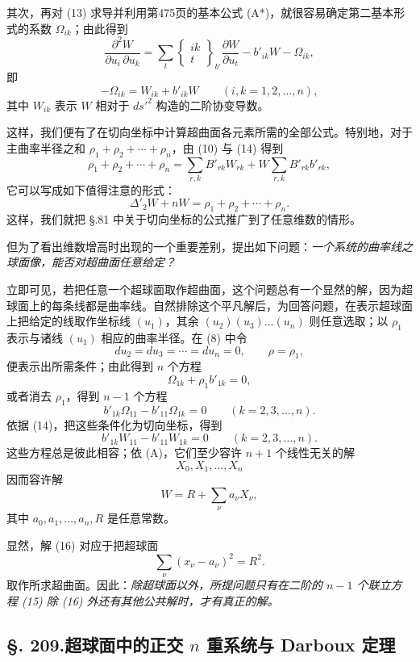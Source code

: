 其次，再对 (13) 求导并利用第475页的基本公式 (A*)，就很容易确定第二基本形式的系数 $\Omega_{ik}$；由此得到
\[
\frac{\partial^2W}{\partial u_i\,\partial u_k}
=\sum_t\left\{\begin{matrix}ik\\t\end{matrix}\right\}_{b'}
\frac{\partial W}{\partial u_t}-b'_{ik}W-\Omega_{ik},
\]
即
\[
\tag{14}
-\Omega_{ik}=W_{ik}+b'_{ik}W\qquad (i,k=1,2,\ldots,n),
\]
其中 $W_{ik}$ 表示 $W$ 相对于 $ds'^2$ 构造的二阶协变导数。

这样，我们便有了在切向坐标中计算超曲面各元素所需的全部公式。特别地，对于主曲率半径之和 $\rho_1+\rho_2+\cdots+\rho_n$，由 (10) 与 (14) 得到
\[
\rho_1+\rho_2+\cdots+\rho_n
=\sum_{r,k}B'_{rk}W_{rk}+W\sum_{r,k}B'_{rk}b'_{rk},
\]
它可以写成如下值得注意的形式：
\[
\tag{VI}
\Delta'_2W+nW=\rho_1+\rho_2+\cdots+\rho_n.
\]
这样，我们就把 \S.81 中关于切向坐标的公式推广到了任意维数的情形。

但为了看出维数增高时出现的一个重要差别，提出如下问题：\emph{一个系统的曲率线之球面像，能否对超曲面任意给定？}

立即可见，若把任意一个超球面取作超曲面，这个问题总有一个显然的解，因为超球面上的每条线都是曲率线。自然排除这个平凡解后，为回答问题，在表示超球面上把给定的线取作坐标线 $(u_1)$，其余 $(u_2)(u_3)\ldots(u_n)$ 则任意选取；以 $\rho_1$ 表示与诸线 $(u_1)$ 相应的曲率半径。在 (8) 中令
\[
du_2=du_3=\cdots=du_n=0,\qquad \rho=\rho_1,
\]
便表示出所需条件；由此得到 $n$ 个方程
\[
\Omega_{1k}+\rho_1b'_{1k}=0,
\]
或者消去 $\rho_1$，得到 $n-1$ 个方程
\[
b'_{1k}\Omega_{11}-b'_{11}\Omega_{1k}=0\qquad(k=2,3,\ldots,n).
\]
依据 (14)，把这些条件化为切向坐标，得到
\[
\tag{15}
b'_{1k}W_{11}-b'_{11}W_{1k}=0\qquad(k=2,3,\ldots,n).
\]
这些方程总是彼此相容；依 (A)，它们至少容许 $n+1$ 个线性无关的解
\[
X_0,X_1,\ldots,X_n
\]
因而容许解
\[
\tag{16}
W=R+\sum_\nu a_\nu X_\nu,
\]
其中 $a_0,a_1,\ldots,a_n,R$ 是任意常数。

显然，解 (16) 对应于把超球面
\[
\sum_\nu (x_\nu-a_\nu)^2=R^2.
\]
取作所求超曲面。因此：\emph{除超球面以外，所提问题只有在二阶的 $n-1$ 个联立方程 (15) 除 (16) 外还有其他公共解时，才有真正的解。}

\subsection*{\S. 209.\quad 超球面中的正交 $n$ 重系统与 Darboux 定理}

